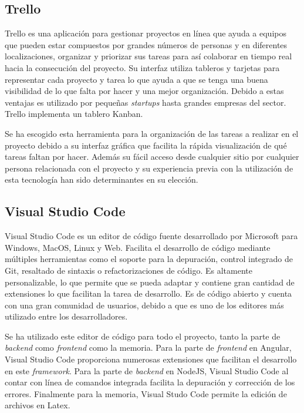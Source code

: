 \subsection{Trello}
Trello \cite{trello} es una aplicación para gestionar proyectos en línea que ayuda a equipos que pueden estar compuestos por grandes números de personas y en diferentes localizaciones, organizar y priorizar sus tareas para así colaborar en tiempo real hacia la consecución del proyecto. Su interfaz utiliza tableros y tarjetas para representar cada proyecto y tarea lo que ayuda a que se tenga una buena visibilidad de lo que falta por hacer y una mejor organización. Debido a estas ventajas es utilizado por pequeñas \textit{startups} hasta grandes empresas del sector. Trello implementa un tablero Kanban.

Se ha escogido esta herramienta para la organización de las tareas a realizar en el proyecto debido a su interfaz gráfica que facilita la rápida visualización de qué tareas faltan por hacer. Además su fácil acceso desde cualquier sitio por cualquier persona relacionada con el proyecto y su experiencia previa con la utilización de esta tecnología han sido determinantes en su elección.




\subsection{Visual Studio Code}
Visual Studio Code \cite{vsc} es un editor de código fuente desarrollado por Microsoft para Windows, MacOS, Linux y Web. Facilita el desarrollo de código mediante múltiples herramientas como el soporte para la depuración, control integrado de Git, resaltado de sintaxis o refactorizaciones de código. Es altamente personalizable, lo que permite que se pueda adaptar y contiene gran cantidad de extensiones lo que facilitan la tarea de desarrollo. Es de código abierto y cuenta con una gran comunidad de usuarios, debido a que es uno de los editores más utilizado entre los desarrolladores. 

Se ha utilizado este editor de código para todo el proyecto, tanto la parte de \textit{backend} como \textit{frontend} como la memoria. Para la parte de \textit{frontend} en Angular, Visual Studio Code proporciona numerosas extensiones que facilitan el desarrollo en este \textit{framework}. Para la parte de \textit{backend} en NodeJS, Visual Studio Code al contar con línea de comandos integrada facilita la depuración y corrección de los errores. Finalmente para la memoria, Visual Studo Code permite la edición de archivos en Latex.



